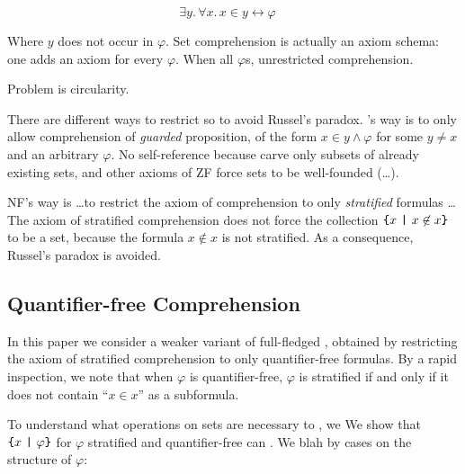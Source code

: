 \documentclass[sigplan,10pt,anonymous,review]{acmart}\settopmatter{printfolios=true,printccs=false,printacmref=false}
\begin{document}
\[ \exists y.\, \forall x.\, x \in y \leftrightarrow \varphi  \quad \tag{\SetCompr} \]


Where $y$ does not occur in $\varphi$. 
Set comprehension is actually an axiom schema: one adds an axiom for every $\varphi$. 
When all $\varphi$s, unrestricted comprehension. 


Problem is circularity.

There are different ways to restrict \SetCompr{} so to avoid Russel's paradox. \ZF's way is to only allow comprehension of \emph{guarded} proposition, of the form $x \in y \land \varphi$ for some $y\neq x$ and an arbitrary $\varphi$.  No self-reference because carve only subsets of already existing sets, and other axioms of ZF force sets to be well-founded (\dots).

NF's way is \dots to restrict the axiom of comprehension to only \emph{stratified} formulas \ldots
The axiom of stratified comprehension does not force the collection $\text{\texttt{\{}} x ~\text{\texttt{|}}~ x \not\in x \text{\texttt{\}}}$ to be a set, because the formula $x \not\in x$ is not stratified. As a consequence, Russel's paradox is avoided.

\subsection{Quantifier-free Comprehension}

In this paper we consider a weaker variant of full-fledged \NF{}, obtained by restricting the axiom of stratified comprehension to only quantifier-free formulas. By a rapid inspection, we note that when $\varphi$ is quantifier-free, $\varphi$ is stratified if and only if it does not contain ``$x \in x$'' as a subformula.

To understand what operations on sets are necessary to , we 
We show that $\text{\texttt{\{}} x ~\text{\texttt{|}}~ \varphi \text{\texttt{\}}}$ for $\varphi$ stratified and quantifier-free can . We blah by cases on the structure of $\varphi$:
\end{document}
